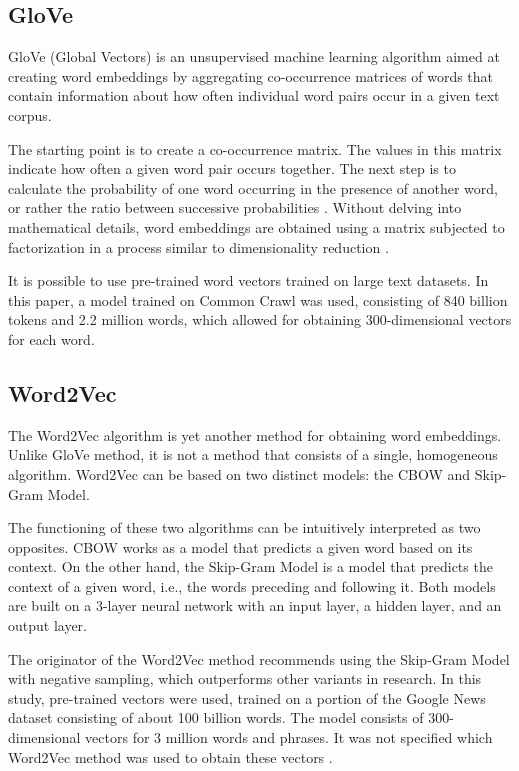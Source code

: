 \subsection{GloVe}
GloVe (Global Vectors) is an unsupervised machine learning algorithm aimed at creating word embeddings by aggregating co-occurrence matrices of words that contain information about how often individual word pairs occur in a given text corpus.

The starting point is to create a co-occurrence matrix. The values in this matrix indicate how often a given word pair occurs together. The next step is to calculate the probability of one word occurring in the presence of another word, or rather the ratio between successive probabilities \autocite{Pennington2014}. Without delving into mathematical details, word embeddings are obtained using a matrix subjected to factorization in a process similar to dimensionality reduction \autocite{Albrecht2020}.

It is possible to use pre-trained word vectors trained on large text datasets. In this paper, a model trained on Common Crawl was used, consisting of 840 billion tokens and 2.2 million words, which allowed for obtaining 300-dimensional vectors for each word.

\subsection{Word2Vec}
The Word2Vec algorithm is yet another method for obtaining word embeddings. Unlike GloVe method, it is not a method that consists of a single, homogeneous algorithm. Word2Vec can be based on two distinct models: the CBOW and Skip-Gram Model.

The functioning of these two algorithms can be intuitively interpreted as two opposites. CBOW works as a model that predicts a given word based on its context. On the other hand, the Skip-Gram Model is a model that predicts the context of a given word, i.e., the words preceding and following it. Both models are built on a 3-layer neural network with an input layer, a hidden layer, and an output layer.

The originator of the Word2Vec method recommends using the Skip-Gram Model with negative sampling, which outperforms other variants in research. In this study, pre-trained vectors were used, trained on a portion of the Google News dataset consisting of about 100 billion words. The model consists of 300-dimensional vectors for 3 million words and phrases. It was not specified which Word2Vec method was used to obtain these vectors \autocite{Mikolov2013}.

